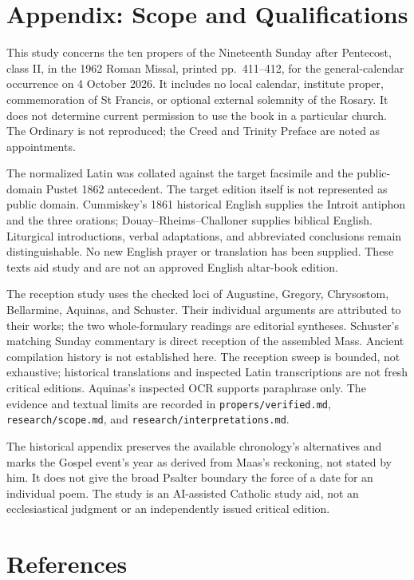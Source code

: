 \section{Appendix: Scope and Qualifications}

This study concerns the ten propers of the Nineteenth Sunday after
Pentecost, class II, in the 1962 Roman Missal, printed pp.~411--412,
for the general-calendar occurrence on 4 October 2026. It includes
no local calendar, institute proper, commemoration of St Francis,
or optional external solemnity of the Rosary. It does not determine
current permission to use the book in a particular church. The
Ordinary is not reproduced; the Creed and Trinity Preface are noted
as appointments.

The normalized Latin was collated against the target facsimile and
the public-domain Pustet 1862 antecedent. The target edition itself
is not represented as public domain. Cummiskey's 1861 historical
English supplies the Introit antiphon and the three orations;
Douay--Rheims--Challoner supplies biblical English. Liturgical
introductions, verbal adaptations, and abbreviated conclusions
remain distinguishable. No new English prayer or translation has
been supplied. These texts aid study and are not an approved
English altar-book edition.

The reception study uses the checked loci of Augustine, Gregory,
Chrysostom, Bellarmine, Aquinas, and Schuster. Their individual
arguments are attributed to their works; the two whole-formulary
readings are editorial syntheses. Schuster's matching Sunday
commentary is direct reception of the assembled Mass. Ancient
compilation history is not established here. The reception sweep
is bounded, not exhaustive; historical translations and inspected
Latin transcriptions are not fresh critical editions. Aquinas's
inspected OCR supports paraphrase only. The evidence and textual
limits are recorded in \texttt{propers/verified.md},
\texttt{research/scope.md}, and \texttt{research/interpretations.md}.

The historical appendix preserves the available chronology's
alternatives and marks the Gospel event's year as derived from Maas's
reckoning, not stated by him. It does not give
the broad Psalter boundary the force of a date for an individual
poem. The study is an AI-assisted Catholic study aid, not an
ecclesiastical judgment or an independently issued critical edition.

\section{References}

